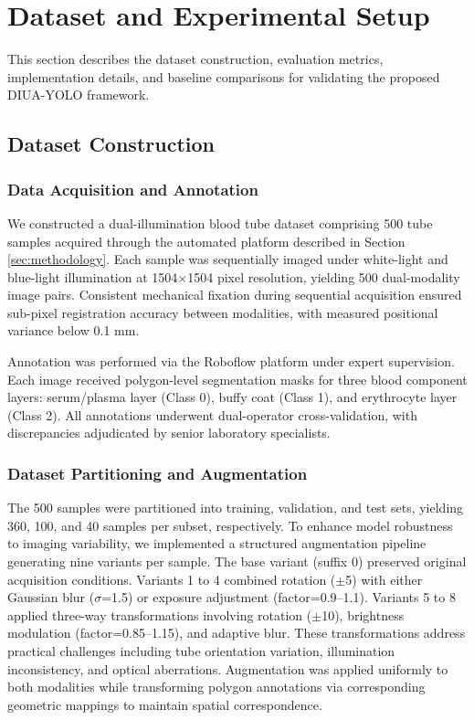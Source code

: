 \section{Dataset and Experimental Setup}
\label{sec:experiments}

This section describes the dataset construction, evaluation metrics, implementation details, and baseline comparisons for validating the proposed DIUA-YOLO framework.

\subsection{Dataset Construction}

\subsubsection{Data Acquisition and Annotation} We constructed a dual-illumination blood tube dataset comprising 500 tube samples acquired through the automated platform described in Section \ref{sec:methodology}. Each sample was sequentially imaged under white-light and blue-light illumination at 1504$\times$1504 pixel resolution, yielding 500 dual-modality image pairs. Consistent mechanical fixation during sequential acquisition ensured sub-pixel registration accuracy between modalities, with measured positional variance below 0.1 mm.

Annotation was performed via the Roboflow platform under expert supervision. Each image received polygon-level segmentation masks for three blood component layers: serum/plasma layer (Class 0), buffy coat (Class 1), and erythrocyte layer (Class 2). All annotations underwent dual-operator cross-validation, with discrepancies adjudicated by senior laboratory specialists.

\subsubsection{Dataset Partitioning and Augmentation} The 500 samples were partitioned into training, validation, and test sets, yielding 360, 100, and 40 samples per subset, respectively. To enhance model robustness to imaging variability, we implemented a structured augmentation pipeline generating nine variants per sample. The base variant (suffix 0) preserved original acquisition conditions. Variants 1 to 4 combined rotation ($\pm$5\degree) with either Gaussian blur ($\sigma$=1.5) or exposure adjustment (factor=0.9--1.1). Variants 5 to 8 applied three-way transformations involving rotation ($\pm$10\degree), brightness modulation (factor=0.85--1.15), and adaptive blur. These transformations address practical challenges including tube orientation variation, illumination inconsistency, and optical aberrations. Augmentation was applied uniformly to both modalities while transforming polygon annotations via corresponding geometric mappings to maintain spatial correspondence.

